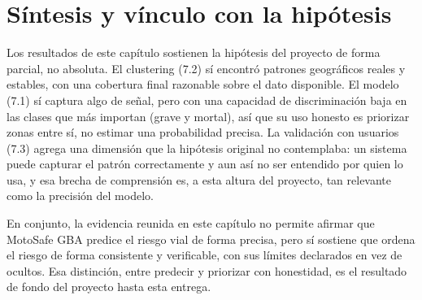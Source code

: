\section{Síntesis y vínculo con la hipótesis}

Los resultados de este capítulo sostienen la hipótesis del proyecto de
forma parcial, no absoluta. El clustering (7.2) sí encontró patrones
geográficos reales y estables, con una cobertura final razonable sobre
el dato disponible. El modelo (7.1) sí captura algo de señal, pero con
una capacidad de discriminación baja en las clases que más importan
(grave y mortal), así que su uso honesto es priorizar zonas entre sí, no
estimar una probabilidad precisa. La validación con usuarios (7.3)
agrega una dimensión que la hipótesis original no contemplaba: un
sistema puede capturar el patrón correctamente y aun así no ser
entendido por quien lo usa, y esa brecha de comprensión es, a esta
altura del proyecto, tan relevante como la precisión del modelo.

En conjunto, la evidencia reunida en este capítulo no permite afirmar
que MotoSafe GBA predice el riesgo vial de forma precisa, pero sí
sostiene que ordena el riesgo de forma consistente y verificable, con
sus límites declarados en vez de ocultos. Esa distinción, entre predecir
y priorizar con honestidad, es el resultado de fondo del proyecto hasta
esta entrega.
